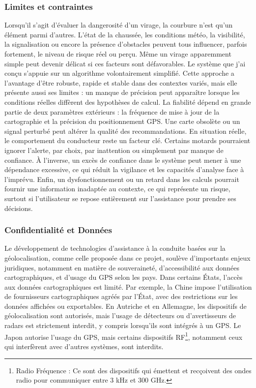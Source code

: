 \subsubsection{Limites et contraintes}
Lorsqu’il s’agit d’évaluer la dangerosité d’un virage, la courbure n’est qu’un élément parmi d’autres. L’état de la chaussée, les conditions météo, la visibilité, la signalisation ou encore la présence d’obstacles peuvent tous influencer, parfois fortement, le niveau de risque réel ou perçu. Même un virage apparemment simple peut devenir délicat si ces facteurs sont défavorables.
Le système que j’ai conçu s’appuie sur un algorithme volontairement simplifié. Cette approche a l’avantage d’être robuste, rapide et stable dans des contextes variés, mais elle présente aussi ses limites : un manque de précision peut apparaître lorsque les conditions réelles diffèrent des hypothèses de calcul. La fiabilité dépend en grande partie de deux paramètres extérieurs : la fréquence de mise à jour de la cartographie et la précision du positionnement GPS. Une carte obsolète ou un signal perturbé peut altérer la qualité des recommandations.
En situation réelle, le comportement du conducteur reste un facteur clé. Certains motards pourraient ignorer l’alerte, par choix, par inattention ou simplement par manque de confiance. À l’inverse, un excès de confiance dans le système peut mener à une dépendance excessive, ce qui réduit la vigilance et les capacités d’analyse face à l’imprévu.
Enfin, un dysfonctionnement ou un retard dans les calculs pourrait fournir une information inadaptée au contexte, ce qui représente un risque, surtout si l’utilisateur se repose entièrement sur l’assistance pour prendre ses décisions.

\subsubsection{Confidentialité et Données}
Le développement de technologies d’assistance à la conduite basées sur la géolocalisation, comme celle proposée dans ce projet, soulève d’importants enjeux juridiques, notamment en matière de souveraineté, d’accessibilité aux données cartographiques, et d’usage du GPS selon les pays.
Dans certains États, l’accès aux données cartographiques est limité. Par exemple, la Chine impose l’utilisation de fournisseurs cartographiques agréés par l’État, avec des restrictions sur les données affichées ou exportables. En Autriche et en Allemagne, les dispositifs de géolocalisation sont autorisés, mais l’usage de détecteurs ou d'avertisseurs de radars est strictement interdit, y compris lorsqu'ils sont intégrés à un GPS. Le Japon autorise l’usage du GPS, mais certains dispositifs RF\footnote{Radio Fréquence : Ce sont des dispositifs qui émettent et recçoivent des ondes radio pour communiquer entre 3 kHz et 300 GHz.}, notamment ceux qui interfèrent avec d'autres systèmes, sont interdits.

